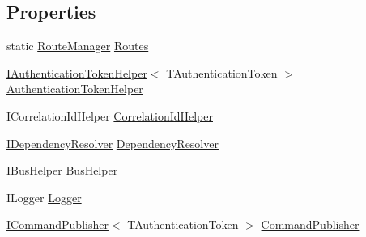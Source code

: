\subsection*{Properties}
\begin{DoxyCompactItemize}
\item 
static \hyperlink{classCqrs_1_1Bus_1_1RouteManager}{Route\+Manager} \hyperlink{classCqrs_1_1Akka_1_1Commands_1_1AkkaCommandBus_a93ddefb347d0cbc4f869c6d0866c8c64_a93ddefb347d0cbc4f869c6d0866c8c64}{Routes}
\item 
\hyperlink{interfaceCqrs_1_1Authentication_1_1IAuthenticationTokenHelper}{I\+Authentication\+Token\+Helper}$<$ T\+Authentication\+Token $>$ \hyperlink{classCqrs_1_1Akka_1_1Commands_1_1AkkaCommandBus_ad74a628484d215ec6daab02b20ac1dbe_ad74a628484d215ec6daab02b20ac1dbe}{Authentication\+Token\+Helper}
\item 
I\+Correlation\+Id\+Helper \hyperlink{classCqrs_1_1Akka_1_1Commands_1_1AkkaCommandBus_ad8bdf5674c0d5ea3fd9340bd8cd4b0a8_ad8bdf5674c0d5ea3fd9340bd8cd4b0a8}{Correlation\+Id\+Helper}
\item 
\hyperlink{interfaceCqrs_1_1Configuration_1_1IDependencyResolver}{I\+Dependency\+Resolver} \hyperlink{classCqrs_1_1Akka_1_1Commands_1_1AkkaCommandBus_ae1229644077b0740d9014708d15b44c2_ae1229644077b0740d9014708d15b44c2}{Dependency\+Resolver}
\item 
\hyperlink{interfaceCqrs_1_1Bus_1_1IBusHelper}{I\+Bus\+Helper} \hyperlink{classCqrs_1_1Akka_1_1Commands_1_1AkkaCommandBus_abe5501970c0e39abb9a70670ab985fdc_abe5501970c0e39abb9a70670ab985fdc}{Bus\+Helper}
\item 
I\+Logger \hyperlink{classCqrs_1_1Akka_1_1Commands_1_1AkkaCommandBus_a218e431067a4cadbdd711d74cbe8e53b_a218e431067a4cadbdd711d74cbe8e53b}{Logger}
\item 
\hyperlink{interfaceCqrs_1_1Commands_1_1ICommandPublisher}{I\+Command\+Publisher}$<$ T\+Authentication\+Token $>$ \hyperlink{classCqrs_1_1Akka_1_1Commands_1_1AkkaCommandBus_ad028b0520a1d98d1e7adcbecb781d261_ad028b0520a1d98d1e7adcbecb781d261}{Command\+Publisher}

\end{DoxyCompactItemize}
